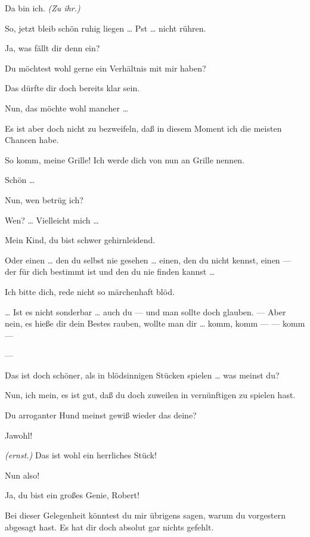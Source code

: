 \documentclass[
	final,
	a4paper,
	ngerman,
	mpinclude = true, %
	twoside = true,
	open = right,
	cleardoublepage = plain,
	DIV = 13,
	BCOR = 1cm,
	titlepage = firstiscover,
	]{scrbook}
\newcommand{\direction}[1]{\textit{(#1)}}
\newcommand{\hiat}{---}
\newcommand{\thecharacter}[1]{\textup{\textsc{#1}}}
\newcommand{\thedichter}{\thecharacter{Dichter}}
\newcommand{\theschauspielerin}{\thecharacter{Schauspielerin}}
\newcommand{\character}[1]{\item[#1:]}
\newcommand{\dichter}{\character{\thedichter}}
\newcommand{\schauspielerin}{\character{\theschauspielerin}}
\begin{document}
\begin{play}
	\dichter
	Da bin ich. \direction{Zu ihr.}

	\schauspielerin
	So, jetzt bleib schön ruhig liegen \ldots{} Pst \ldots{} nicht rühren.

	\dichter
	Ja, was fällt dir denn ein?

	\schauspielerin
	Du möchtest wohl gerne ein Verhältnis mit mir haben?

	\dichter
	Das dürfte dir doch bereits klar sein.

	\schauspielerin
	Nun, das möchte wohl mancher \ldots{}

	\dichter
	Es ist aber doch nicht zu bezweifeln, daß in diesem Moment ich die meisten Chancen habe.

	\schauspielerin
	So komm, meine Grille! Ich werde dich von nun an Grille nennen.

	\dichter
	Schön \ldots{}

	\schauspielerin
	Nun, wen betrüg ich?

	\dichter
	Wen? \ldots{} Vielleicht mich \ldots{}

	\schauspielerin
	Mein Kind, du bist schwer gehirnleidend.

	\dichter
	Oder einen \ldots{} den du selbst nie gesehen \ldots{} einen, den du nicht kennst, einen --- der für dich bestimmt ist und den du nie finden kannst \ldots{}

	\schauspielerin
	Ich bitte dich, rede nicht so märchenhaft blöd.

	\dichter
	\ldots{} Ist es nicht sonderbar \ldots{} auch du --- und man sollte doch glauben. --- Aber nein, es hieße dir dein Bestes rauben, wollte man dir \ldots{} komm, komm --- --- komm ---

	\hiat

	\schauspielerin
	Das ist doch schöner, als in blödsinnigen Stücken spielen \ldots{} was meinst du?

	\dichter
	Nun, ich mein, es ist gut, daß du doch zuweilen in vernünftigen zu spielen hast.

	\schauspielerin
	Du arroganter Hund meinst gewiß wieder das deine?

	\dichter
	Jawohl!

	\schauspielerin
	\direction{ernst.} Das ist wohl ein herrliches Stück!

	\dichter
	Nun also!

	\schauspielerin
	Ja, du bist ein großes Genie, Robert!

	\dichter
	Bei dieser Gelegenheit könntest du mir übrigens sagen, warum du vorgestern abgesagt hast. Es hat dir doch absolut gar nichts gefehlt.


\end{play}
\end{document}
